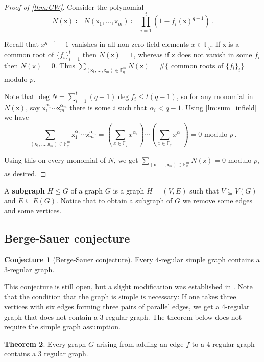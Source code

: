 \documentclass[12pt]{amsart}
\theoremstyle{definition}
\newtheorem{thm}{Theorem}[section]
\newtheorem{conj}[thm]{Conjecture}
\newcommand{\F}{\mathbb{F}}
\newcommand{\vx}{\mathsf{x}}
\begin{document}
\begin{proof}[Proof of \cref{thm:CW}]
Consider the polynomial 
$$ N(\vx) \coloneqq N(\vx_1, \ldots, \vx_m ) \coloneqq \prod_{i=1}^t ( 1 - f_i(\vx )^{q-1} )\, . $$

Recall that $x^{q-1} - 1 $ vanishes in all non-zero field elements $x \in \F_q$.
If $\vx  $ is a common root of $\{f_i\}_{i=1}^t$ then $N(\vx) = 1$, whereas if $\vx $ does not vanish in some $f_i$ then $N(\vx) = 0$.
Thus $\sum_{(\vx_1, \ldots, \vx_m) \in \F_q^m} N(\vx) = \# \{ \text{ common roots of } \{f_i\}_i \}$ modulo $p$.

Note that $\deg N = \sum_{i= 1}^t (q-1)\deg f_i \leq t(q-1)$, so for any monomial in $N(\vx )$, say $ \vx_1^{\alpha_1}\cdots \vx_m^{\alpha_m}$ there is some $i$ such that $\alpha_i < q-1$.
Using \cref{lm:sum_infield} we have 
$$\sum_{(\vx_1, \ldots, \vx_m) \in \F_q^m} \vx_1^{\alpha_1}\cdots \vx_m^{\alpha_m} = \left(\sum_{x\in\F_q}x^{\alpha_1} \right) \cdots \left(\sum_{x\in\F_q}x^{\alpha_1} \right) = 0  \text{ modulo $p$}\, . $$

Using this on every monomial of $N$, we get $\sum_{(\vx_1, \ldots, \vx_m) \in \F_q^m} N(\vx) = 0$ modulo $p$, as desired.
\end{proof}

A \textbf{subgraph} $H\leq G$ of a graph $G$ is a graph $H = (V, E)$ such that $V \subseteq V(G)$ and $E \subseteq E(G) $.
Notice that to obtain a subgraph of $G$ we remove some edges and some vertices.

\subsection{Berge-Sauer conjecture}

\begin{conj}[Berge-Sauer conjecture]
Every $4$-regular simple graph contains a $3$-regular graph.
\end{conj}

This conjecture is still open, but a slight modification was established in \cite{alon1984every}.
Note that the condition that the graph is simple is necessary: If one takes three vertices with six edges forming three pairs of parallel edges, we get a $4$-regular graph that does not contain a $3$-regular graph.
The theorem below does not require the simple graph assumption.

\begin{thm}\label{thm:3reggraphs}
Every graph $G$ arising from adding an edge $f$ to a $4$-regular graph contains a $3$ regular graph.
\end{thm}
\end{document}
